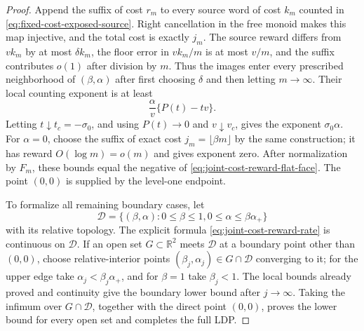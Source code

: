 \begin{proof}
Append the suffix of cost \(r_m\) to every source word of cost \(k_m\) counted
in \eqref{eq:fixed-cost-exposed-source}.  Right cancellation in the free
monoid makes this map injective, and the total cost is exactly \(j_m\).  The
source reward differs from \(vk_m\) by at most \(\delta k_m\), the floor
error in \(vk_m/m\) is at most \(v/m\), and the suffix contributes \(o(1)\)
after division by \(m\).  Thus the images enter every prescribed
neighborhood of \((\beta,\alpha)\) after first choosing \(\delta\) and then
letting \(m\to\infty\).  Their local counting exponent is at least
\[
 \frac{\alpha}{v}\{P(t)-tv\}.
\]
Letting \(t\downarrow t_c=-\sigma_0\), and using \(P(t)\to0\) and
\(v\downarrow v_c\), gives the exponent \(\sigma_0\alpha\).  For
\(\alpha=0\), choose the suffix of exact cost
\(j_m=\lfloor\beta m\rfloor\) by the same construction; it has reward
\(O(\log m)=o(m)\) and gives exponent zero.  After normalization by \(F_m\),
these bounds equal the negative of
\eqref{eq:joint-cost-reward-flat-face}.  The point \((0,0)\) is supplied by
the level-one endpoint.

To formalize all remaining boundary cases, let
\[
 \mathcal D=\{(\beta,\alpha):0\le\beta\le1,
                 0\le\alpha\le\beta\alpha_+\}
\]
with its relative topology.  The explicit formula
\eqref{eq:joint-cost-reward-rate} is continuous on \(\mathcal D\).  If an
open set \(G\subset\mathbb R^2\) meets \(\mathcal D\) at a boundary point
other than \((0,0)\), choose relative-interior points
\((\beta_j,\alpha_j)\in G\cap\mathcal D\) converging to it; for the upper
edge take \(\alpha_j<\beta_j\alpha_+\), and for \(\beta=1\) take
\(\beta_j<1\).  The local bounds already proved and continuity give the
boundary lower bound after \(j\to\infty\).  Taking the infimum over
\(G\cap\mathcal D\), together with the direct point \((0,0)\), proves the
lower bound for every open set and completes the full LDP.
\end{proof}


